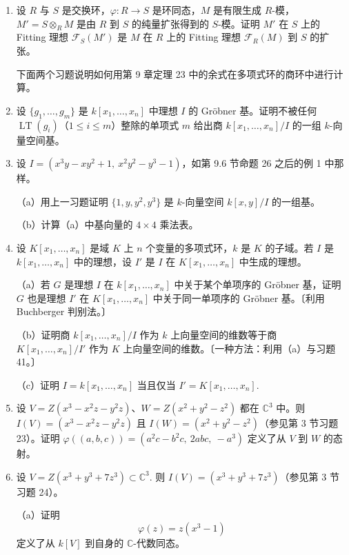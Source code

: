 \begin{enumerate}
\item 设 \(R\) 与 \(S\) 是交换环，\(\varphi : R \to S\) 是环同态，\(M\) 是有限生成 \(R\)-模，\(M' = S \otimes_R M\) 是由 \(R\) 到 \(S\) 的纯量扩张得到的 \(S\)-模。证明 \(M'\) 在 \(S\) 上的 Fitting 理想 \(\mathcal{F}_S(M')\) 是 \(M\) 在 \(R\) 上的 Fitting 理想 \(\mathcal{F}_R(M)\) 到 \(S\) 的扩张。

\noindent 下面两个习题说明如何用第 9 章定理 23 中的余式在多项式环的商环中进行计算。

\item 设 \(\{g_1, \ldots, g_m\}\) 是 \(k[x_1, \ldots, x_n]\) 中理想 \(I\) 的 Gröbner 基。证明不被任何 \(\operatorname{LT}(g_i)\)（\(1 \leq i \leq m\)）整除的单项式 \(m\) 给出商 \(k[x_1, \ldots, x_n]/I\) 的一组 \(k\)-向量空间基。

\item 设 \(I = (x^3y-xy^2+1,\ x^2y^2-y^3-1)\)，如第 9.6 节命题 26 之后的例 1 中那样。

（a）用上一习题证明 \(\{1, y, y^2, y^3\}\) 是 \(k\)-向量空间 \(k[x,y]/I\) 的一组基。

（b）计算（a）中基向量的 \(4 \times 4\) 乘法表。

\item 设 \(K[x_1, \ldots, x_n]\) 是域 \(K\) 上 \(n\) 个变量的多项式环，\(k\) 是 \(K\) 的子域。若 \(I\) 是 \(k[x_1, \ldots, x_n]\) 中的理想，设 \(I'\) 是 \(I\) 在 \(K[x_1, \ldots, x_n]\) 中生成的理想。

（a）若 \(G\) 是理想 \(I\) 在 \(k[x_1, \ldots, x_n]\) 中关于某个单项序的 Gröbner 基，证明 \(G\) 也是理想 \(I'\) 在 \(K[x_1, \ldots, x_n]\) 中关于同一单项序的 Gröbner 基。〔利用 Buchberger 判别法。〕

（b）证明商 \(k[x_1, \ldots, x_n]/I\) 作为 \(k\) 上向量空间的维数等于商 \(K[x_1, \ldots, x_n]/I'\) 作为 \(K\) 上向量空间的维数。〔一种方法：利用（a）与习题 41。〕

（c）证明 \(I = k[x_1, \ldots, x_n]\) 当且仅当 \(I' = K[x_1, \ldots, x_n]\).

\item 设 \(V = Z(x^3-x^2z-y^2z)\)、\(W = Z(x^2+y^2-z^2)\) 都在 \(\mathbb{C}^3\) 中。则 \(I(V) = (x^3-x^2z-y^2z)\) 且 \(I(W) = (x^2+y^2-z^2)\)（参见第 3 节习题 23）。证明 \(\varphi((a,b,c)) = (a^2c-b^2c,\ 2abc,\ -a^3)\) 定义了从 \(V\) 到 \(W\) 的态射。

\item 设 \(V = Z(x^3+y^3+7z^3) \subset \mathbb{C}^3\). 则 \(I(V) = (x^3+y^3+7z^3)\)（参见第 3 节习题 24）。

（a）证明
\[
\varphi(z) = z(x^3-1)
\]
定义了从 \(k[V]\) 到自身的 \(\mathbb{C}\)-代数同态。


\end{enumerate}
